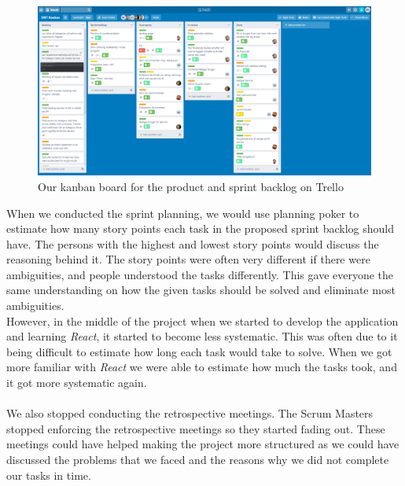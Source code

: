 \begin{figure}[H]
    \centering
    \includegraphics[width=0.8\linewidth]{figures/trellopicture.PNG}
    \caption{Our kanban board for the product and sprint backlog on Trello}
    \label{fig:trello-kanban}
\end{figure}
\noindent
When we conducted the sprint planning, we would use planning poker to estimate how many story points each task in the proposed sprint backlog should have.
The persons with the highest and lowest story points would discuss the reasoning behind it.
The story points were often very different if there were ambiguities, and people understood the tasks differently.
This gave everyone the same understanding on how the given tasks should be solved and eliminate most ambiguities. 
\\
However, in the middle of the project when we started to develop the application and learning \textit{React}, it started to become less systematic.
This was often due to it being difficult to estimate how long each task would take to solve.
When we got more familiar with \textit{React} we were able to estimate how much the tasks took, and it got more systematic again.
\\\\
We also stopped conducting the retrospective meetings.
The Scrum Masters stopped enforcing the retrospective meetings so they started fading out.
These meetings could have helped making the project more structured as we could have discussed the problems that we faced and the reasons why we did not complete our tasks in time.

